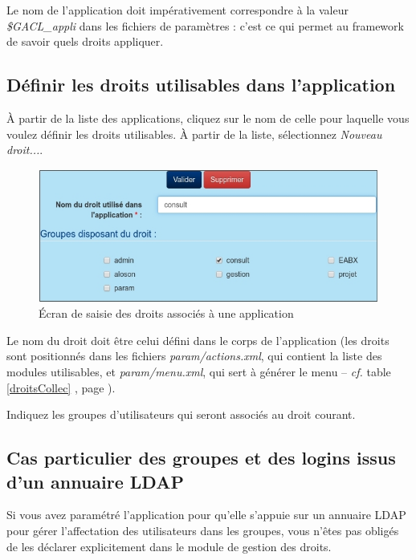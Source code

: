 Le nom de l'application doit impérativement correspondre à la valeur \textit{\$GACL\_appli} dans les fichiers de paramètres : c'est ce qui permet au framework de savoir quels droits appliquer.

\subsection{Définir les droits utilisables dans l'application}

À partir de la liste des applications, cliquez sur le nom de celle pour laquelle vous voulez définir les droits utilisables. 
À partir de la liste, sélectionnez \textit{Nouveau droit...}.

\begin{figure}[H]
\includegraphics[width=\linewidth]{images/appli_droit}
\caption{Écran de saisie des droits associés à une application}
\label{applidroit}
\end{figure}

Le nom du droit doit être celui défini dans le corps de l'application (les droits sont positionnés dans les fichiers \textit{param/actions.xml}, qui contient la liste des modules utilisables, et \textit{param/menu.xml}, qui sert à générer le menu -- \textit{cf.} table \ref{droitsCollec} \textit{}, page \pageref{droitsCollec}).

Indiquez les groupes d'utilisateurs qui seront associés au droit courant.

\subsection{Cas particulier des groupes et des logins issus d'un annuaire LDAP}

Si vous avez paramétré l'application pour qu'elle s'appuie sur un annuaire LDAP pour gérer l'affectation des utilisateurs dans les groupes, vous n'êtes pas obligés de les déclarer explicitement dans le module de gestion des droits.

